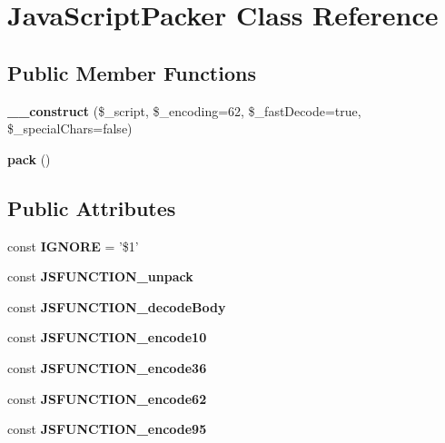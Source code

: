 \hypertarget{class_java_script_packer}{\section{Java\-Script\-Packer Class Reference}
\label{class_java_script_packer}
}
\subsection*{Public Member Functions}
\begin{DoxyCompactItemize}
\item 
\hypertarget{class_java_script_packer_af7aa7792227ab2d075c8afc86c237903}{{\bfseries \-\_\-\-\_\-construct} (\$\-\_\-script, \$\-\_\-encoding=62, \$\-\_\-fast\-Decode=true, \$\-\_\-special\-Chars=false)}\label{class_java_script_packer_af7aa7792227ab2d075c8afc86c237903}

\item 
\hypertarget{class_java_script_packer_afc8fde5237ea0f00405a860b202a81c4}{{\bfseries pack} ()}\label{class_java_script_packer_afc8fde5237ea0f00405a860b202a81c4}

\end{DoxyCompactItemize}
\subsection*{Public Attributes}
\begin{DoxyCompactItemize}
\item 
\hypertarget{class_java_script_packer_aa29c300dc97ed8c72a5f9f40f9ef24c3}{const {\bfseries I\-G\-N\-O\-R\-E} = '\$1'}\label{class_java_script_packer_aa29c300dc97ed8c72a5f9f40f9ef24c3}

\item 
const {\bfseries J\-S\-F\-U\-N\-C\-T\-I\-O\-N\-\_\-unpack}
\item 
const {\bfseries J\-S\-F\-U\-N\-C\-T\-I\-O\-N\-\_\-decode\-Body}
\item 
const {\bfseries J\-S\-F\-U\-N\-C\-T\-I\-O\-N\-\_\-encode10}
\item 
const {\bfseries J\-S\-F\-U\-N\-C\-T\-I\-O\-N\-\_\-encode36}
\item 
const {\bfseries J\-S\-F\-U\-N\-C\-T\-I\-O\-N\-\_\-encode62}
\item 
const {\bfseries J\-S\-F\-U\-N\-C\-T\-I\-O\-N\-\_\-encode95}
\end{DoxyCompactItemize}


